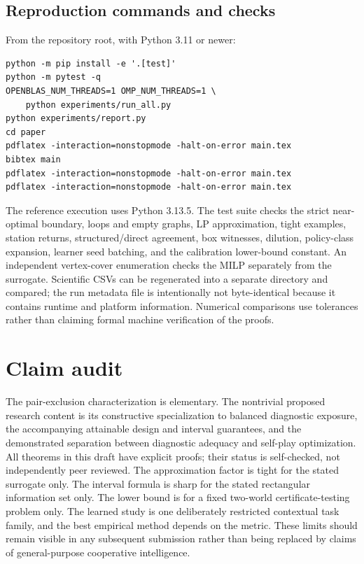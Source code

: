 \documentclass[11pt]{article}
\theoremstyle{definition}\newtheorem{definition}[theorem]{Definition}
\newcommand{\1}{\mathbf{1}}
\begin{document}
\subsection{Reproduction commands and checks}
From the repository root, with Python 3.11 or newer:
\begin{verbatim}
python -m pip install -e '.[test]'
python -m pytest -q
OPENBLAS_NUM_THREADS=1 OMP_NUM_THREADS=1 \
    python experiments/run_all.py
python experiments/report.py
cd paper
pdflatex -interaction=nonstopmode -halt-on-error main.tex
bibtex main
pdflatex -interaction=nonstopmode -halt-on-error main.tex
pdflatex -interaction=nonstopmode -halt-on-error main.tex
\end{verbatim}
The reference execution uses Python 3.13.5. The test suite checks the strict near-optimal boundary, loops and empty graphs, LP approximation, tight examples, station returns, structured/direct agreement, box witnesses, dilution, policy-class expansion, learner seed batching, and the calibration lower-bound constant. An independent vertex-cover enumeration checks the MILP separately from the surrogate. Scientific CSVs can be regenerated into a separate directory and compared; the run metadata file is intentionally not byte-identical because it contains runtime and platform information. Numerical comparisons use tolerances rather than claiming formal machine verification of the proofs.

\section{Claim audit}
The pair-exclusion characterization is elementary. The nontrivial proposed research content is its constructive specialization to balanced diagnostic exposure, the accompanying attainable design and interval guarantees, and the demonstrated separation between diagnostic adequacy and self-play optimization. All theorems in this draft have explicit proofs; their status is self-checked, not independently peer reviewed. The approximation factor is tight for the stated surrogate only. The interval formula is sharp for the stated rectangular information set only. The lower bound is for a fixed two-world certificate-testing problem only. The learned study is one deliberately restricted contextual task family, and the best empirical method depends on the metric. These limits should remain visible in any subsequent submission rather than being replaced by claims of general-purpose cooperative intelligence.
\end{document}
